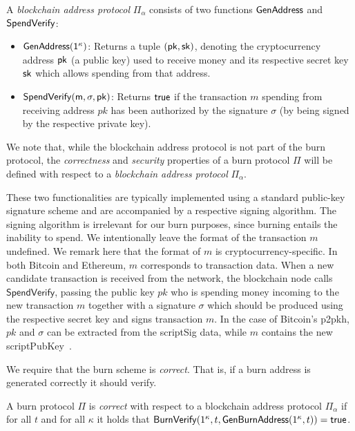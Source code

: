 \begin{definition}
  A \emph{blockchain address protocol} $\Pi_\alpha$ consists of two functions $\sf{GenAddress}$ and $\sf{SpendVerify}$:

  \begin{itemize}
    \item $\sf{GenAddress}(1^\kappa)$: Returns a tuple $(\sf{pk}, \sf{sk})$, denoting the cryptocurrency address $\sf{pk}$ (a public key) used to receive money and its respective secret key $\sf{sk}$ which allows spending from that address.

    \item $\sf{SpendVerify}(m, \sigma, pk)$: Returns $\sf{true}$ if the transaction $m$ spending from receiving address $pk$ has been authorized by the signature $\sigma$ (by being signed by the respective private key).
  \end{itemize}
\end{definition}

We note that, while the blockchain address protocol is not part of the burn protocol, the \emph{correctness} and \emph{security} properties of a burn protocol $\Pi$ will be defined with respect to a \emph{blockchain address protocol} $\Pi_\alpha$.

These two functionalities are typically implemented using a standard public-key signature scheme and are accompanied by a respective signing algorithm. The signing algorithm is irrelevant for our burn purposes, since burning entails the inability to spend. We intentionally leave the format of the transaction $m$ undefined. We remark here that the format of $m$ is cryptocurrency-specific. In both Bitcoin and Ethereum, $m$ corresponds to transaction data. When a new candidate transaction is received from the network, the blockchain node calls $\textsf{SpendVerify}$, passing the public key $pk$ who is spending money incoming to the new transaction $m$ together with a signature $\sigma$ which should be produced using the respective secret key and signs transaction $m$. In the case of Bitcoin's p2pkh, $pk$ and $\sigma$ can be extracted from the scriptSig data, while $m$ contains the new scriptPubKey~\cite{bitcoin-dev-guide}.

We require that the burn scheme is \emph{correct}. That is, if a burn address is generated correctly it should verify.

\begin{definition}[Correctness]
  A burn protocol $\Pi$ is \emph{correct} with respect to a blockchain address protocol $\Pi_\alpha$ if for all $t$ and for all $\kappa$ it holds that
  $\mathsf{BurnVerify}(1^\kappa, t, \mathsf{Gen}\-\mathsf{Burn}\-\mathsf{Address}(1^\kappa, t)) = \textsf{true}$.
\end{definition}

